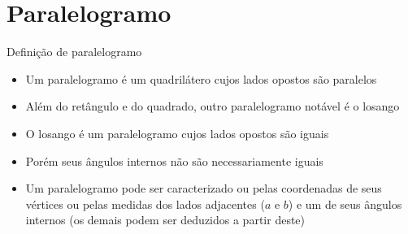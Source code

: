 \section{Paralelogramo}

\begin{frame}[fragile]{Definição de paralelogramo}

    \begin{itemize}
        \item Um paralelogramo é um quadrilátero cujos lados opostos são paralelos
        \pause

        \item Além do retângulo e do quadrado, outro paralelogramo notável é o losango
        \pause

        \item O losango é um paralelogramo cujos lados opostos são iguais
        \pause

        \item Porém seus ângulos internos não são necessariamente iguais
        \pause

        \item Um paralelogramo pode ser caracterizado ou pelas coordenadas de seus
            vértices ou pelas medidas dos lados adjacentes ($a$ e $b$) e um de
            seus ângulos internos (os demais podem ser deduzidos a partir deste)
        \pause
    \end{itemize}

    \begin{figure}
        \centering

    \end{figure}

\end{frame}

